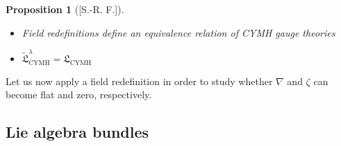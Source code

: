 \documentclass[hyperref={pdfpagelabels=false}]{beamer}
\theoremstyle{plain}
\newtheorem{proposition}[theorem]{Proposition}
\theoremstyle{remark}
\begin{document}
{\begin{frame}
\begin{proposition}[{[S.-R. F.]}]
\begin{itemize}
	\item Field redefinitions define an equivalence relation of CYMH gauge theories
	\item $\widetilde{\mathfrak{L}}^\lambda_{\mathrm{CYMH}} = \mathfrak{L}_{\mathrm{CYMH}}$
\end{itemize}
\end{proposition}
\pause
Let us now apply a field redefinition in order to study whether $\nabla$ and $\zeta$ can become flat and zero, respectively.
\end{frame}
}

\subsection{Lie algebra bundles}
\end{document}
